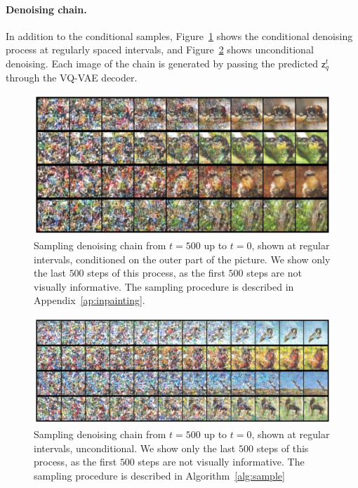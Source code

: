 \documentclass{article}
\theoremstyle{plain}
\theoremstyle{definition}
\theoremstyle{remark}
\newcommand{\latentdis}{\mathsf{z}_q}
\begin{document}
\paragraph{Denoising chain. }
In addition to the conditional samples, Figure~\ref{fig:miniimagenet_prior_ours_chain} shows the conditional denoising process at regularly spaced intervals, and Figure~\ref{fig:miniimagenet_prior_ours_chain_unconditional} shows unconditional denoising. Each image of the chain is generated by passing the predicted $\latentdis^t$ through the VQ-VAE decoder.

\begin{figure}
    \centering
    \includegraphics[width=.7\linewidth]{./chains2.pdf}
    \caption{Sampling denoising chain from $t=500$ up to $t=0$, shown at regular intervals, conditioned on the outer part of the picture. We show only the last $500$ steps of this process, as the first $500$ steps are not visually informative. The sampling procedure is described in Appendix~\ref{ap:inpainting}.}
    \label{fig:miniimagenet_prior_ours_chain}
\end{figure}


\begin{figure}
    \centering
    \includegraphics[width=.7\linewidth]{./chains_unconditional.pdf}
    \caption{Sampling denoising chain from $t=500$ up to $t=0$, shown at regular intervals, unconditional. We show only the last $500$ steps of this process, as the first $500$ steps are not visually informative. The sampling procedure is described in Algorithm~\ref{alg:sample}}
    \label{fig:miniimagenet_prior_ours_chain_unconditional}
\end{figure}
\end{document}
